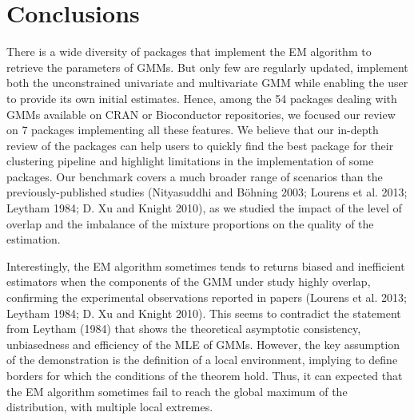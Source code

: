 \hypertarget{conclusions}{%
\section{Conclusions}\label{conclusions}}

There is a wide diversity of packages that implement the EM algorithm to
retrieve the parameters of GMMs. But only few are regularly updated,
implement both the unconstrained univariate and multivariate GMM while enabling the user to provide
its own initial estimates. Hence, among the 54 packages dealing
with GMMs available on CRAN or Bioconductor repositories, we focused our
review on 7 packages implementing all these features. We believe that our in-depth review of the packages can help users to quickly find the best package for their clustering
pipeline and highlight limitations in the implementation of some
packages. Our benchmark covers a much broader range of scenarios
than the previously-published studies (Nityasuddhi and Böhning 2003; Lourens et al. 2013; Leytham 1984; D. Xu and Knight 2010), as we studied the impact of the
level of overlap and the imbalance of the mixture proportions on the
quality of the estimation.

Interestingly, the EM algorithm sometimes tends to returns biased and
inefficient estimators when the components of the GMM under study highly overlap, confirming the experimental observations reported in papers (Lourens et al. 2013; Leytham 1984; D. Xu and Knight 2010). This seems to contradict the statement from Leytham (1984) that shows the theoretical asymptotic consistency, unbiasedness and efficiency of the MLE of GMMs. However, the key assumption of the demonstration is the definition of a local environment, implying to define borders for which the conditions of the theorem hold. Thus, it can expected that the EM algorithm sometimes fail to reach the global maximum of the distribution, with multiple local extremes.

